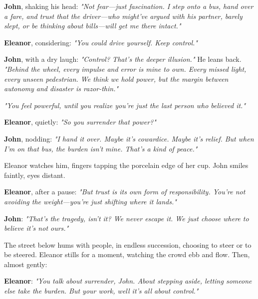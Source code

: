 \textbf{John}, shaking his head: \textit{"Not fear—just fascination. I step onto a bus, hand over a fare, and trust that the driver—who might’ve argued with his partner, barely slept, or be thinking about bills—will get me there intact."}

\bigskip

\textbf{Eleanor}, considering: \textit{"You could drive yourself. Keep control."}

\bigskip

\textbf{John}, with a dry laugh: \textit{"Control? That’s the deeper illusion."} He leans back. \textit{"Behind the wheel, every impulse and error is mine to own. Every missed light, every unseen pedestrian. We think we hold power, but the margin between autonomy and disaster is razor-thin."}

\bigskip

\textit{"You feel powerful, until you realize you’re just the last person who believed it."}

\bigskip

\textbf{Eleanor}, quietly: \textit{"So you surrender that power?"}

\bigskip

\textbf{John}, nodding: \textit{"I hand it over. Maybe it’s cowardice. Maybe it’s relief. But when I’m on that bus, the burden isn’t mine. That’s a kind of peace."}

\bigskip

Eleanor watches him, fingers tapping the porcelain edge of her cup. John smiles faintly, eyes distant.

\bigskip

\textbf{Eleanor}, after a pause: \textit{"But trust is its own form of responsibility. You’re not avoiding the weight—you’re just shifting where it lands."}

\textbf{John}: \textit{"That’s the tragedy, isn’t it? We never escape it. We just choose where to believe it’s not ours."}

\bigskip

The street below hums with people, in endless succession, choosing to steer or to be steered. Eleanor stills for a moment, watching the crowd ebb and flow. Then, almost gently:

\bigskip

\textbf{Eleanor}: \textit{"You talk about surrender, John. About stepping aside, letting someone else take the burden. But your work, well it’s all about control."}

\bigskip

